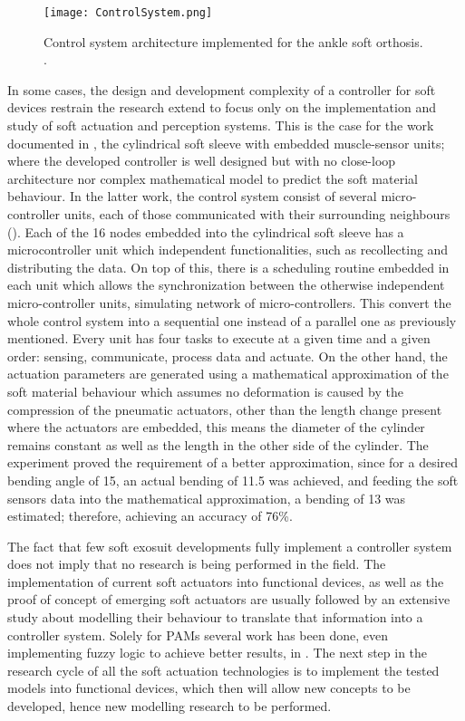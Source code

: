 \begin{figure}[hbtp!]
    \centering
    \texttt{[image: ControlSystem.png]}
    \caption{Control system architecture implemented for the ankle soft orthosis. \cite{park2011bio}. }
    \label{fig:control_system}
\end{figure}

In some cases, the design and development complexity of a controller for soft devices restrain the research extend to focus only on the implementation and study of soft actuation and perception systems. This is the case for the work documented in \cite{Park2012}, the cylindrical soft sleeve with embedded muscle-sensor units; where the developed controller is well designed but with no close-loop architecture nor complex mathematical model to predict the soft material behaviour. In the latter work, the control system consist of several micro-controller units, each of those communicated with their surrounding neighbours (). Each of the 16 nodes embedded into the cylindrical soft sleeve has a microcontroller unit which independent functionalities, such as recollecting and distributing the data. On top of this, there is a scheduling routine embedded in each unit which allows the synchronization between the otherwise independent micro-controller units, simulating network of micro-controllers. This convert the whole control system into a sequential one instead of a parallel one as previously mentioned. Every unit has four tasks to execute at a given time and a given order: sensing, communicate, process data and actuate. On the other hand, the actuation parameters are generated using a mathematical approximation of the soft material behaviour which assumes no deformation is caused by the compression of the pneumatic actuators, other than the length change present where the actuators are embedded, this means the diameter of the cylinder remains constant as well as the length in the other side of the cylinder. The experiment proved the requirement of a better approximation, since for a desired bending angle of 15\textdegree{}, an actual bending of 11.5\textdegree{} was achieved, and feeding the soft sensors data into the mathematical approximation, a bending of 13\textdegree{} was estimated; therefore, achieving an accuracy of 76\%.

The fact that few soft exosuit developments fully implement a controller system does not imply that no research is being performed in the field. The implementation of current soft actuators into functional devices, as well as the proof of concept of emerging soft actuators are usually followed by an extensive study about modelling their behaviour to translate that information into a controller system. Solely for PAMs several work has been done, even implementing fuzzy logic to achieve better results, in \cite{Chang2015,Skorina2015,Bishop-Moser2015,Hosovsky2016}. The next step in the research cycle of all the soft actuation technologies is to implement the tested models into functional devices, which then will allow new concepts to be developed, hence new modelling research to be performed.

